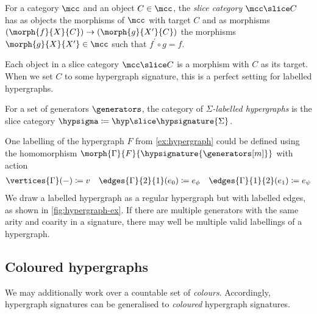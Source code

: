 \begin{definition}\label{def:slice-category}
    For a category \(\mcc\) and an object \(C \in \mcc\), the
    \emph{slice category} \(\mcc \slice C\) has as objects the morphisms of
    \(\mcc\) with target \(C\) and as morphisms
    \((\morph{f}{X}{C}) \to (\morph{g}{X^\prime}{C})\) the morphisms
    \(\morph{g}{X}{X^\prime} \in \mcc\) such that \(f^\prime\circ g = f\).
\end{definition}

Each object in a slice category \(\mcc \slice C\) is a morphism with \(C\) as
its target.
When we set \(C\) to some hypergraph signature, this is a perfect setting for
labelled hypergraphs.

\begin{definition}
    For a set of generators \(\generators\), the category of
    \emph{\(\Sigma\)-labelled hypergraphs} is the slice category
    \(\hypsigma \coloneqq \hyp \slice \hypsignature{\Sigma}\).
\end{definition}

\begin{example}\label{ex:labelled-hypergraph}
    One labelling of the hypergraph \(F\) from \cref{ex:hypergraph} could be
    defined using the homomorphism
    \(\morph{\Gamma}{F}{\hypsignature{\generators[m]}}\) with action
    \begin{gather*}
        \vertices{\Gamma}(-) \coloneqq v
        \quad
        \edges{\Gamma}{2}{1}(e_0) \coloneqq e_\phi
        \quad
        \edges{\Gamma}{1}{2}(e_1) \coloneqq e_\psi
    \end{gather*}
    We draw a labelled hypergraph as a regular hypergraph but with labelled
    edges, as shown in \cref{fig:hypergraph-ex}.
    If there are multiple generators with the same arity and coarity
    in a signature, there may well be multiple valid labellings of a hypergraph.
\end{example}

\subsection{Coloured hypergraphs}

We may additionally work over a countable set of \emph{colours}.
Accordingly, hypergraph signatures can be generalised to \emph{coloured}
hypergraph signatures.

